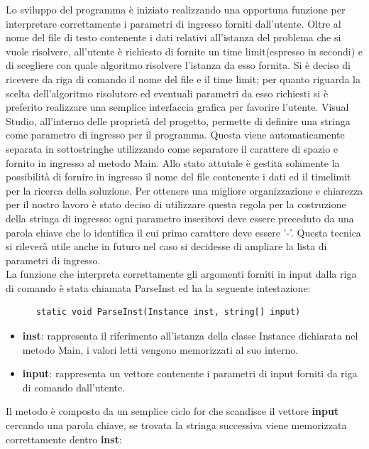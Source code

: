 \documentclass[11pt]{article}
\begin{document}
Lo sviluppo del programma \`e iniziato realizzando una opportuna funzione per interpretare correttamente i parametri di ingresso forniti dall'utente. Oltre al nome del file di testo contenente i dati relativi  all'istanza del problema che si vuole risolvere, all'utente \`e richiesto di fornite un time limit(espresso in secondi) e di scegliere con quale algoritmo risolvere l'istanza da esso fornita. Si \`e deciso di ricevere da riga di comando il nome del file e il time limit; per quanto riguarda la scelta dell'algoritmo risolutore ed eventuali parametri da esso richiesti si \`e preferito realizzare una semplice interfaccia grafica per favorire l'utente. 
Visual Studio, all'interno delle proprietà del progetto, permette di definire una stringa come parametro di ingresso per il programma. Questa viene automaticamente separata in sottostringhe utilizzando come separatore il carattere di spazio e fornito in ingresso al metodo Main. Allo stato attutale è gestita solamente la possibilità di fornire in ingresso il nome del file contenente i dati ed il timelimit per la ricerca della soluzione. Per ottenere una migliore organizzazione e chiarezza per il nostro lavoro è stato deciso di utilizzare questa regola per la costruzione della stringa di ingresso: ogni parametro inseritovi deve essere preceduto da una parola chiave che lo identifica il cui primo carattere deve essere '-'. Questa tecnica si rileverà utile anche in futuro nel caso si decidesse di ampliare la lista di parametri di ingresso.\\
La funzione che interpreta correttamente gli argomenti forniti in input dalla riga di comando \`e stata chiamata ParseInst ed ha la seguente intestazione:

\begin{lstlisting}
	  static void ParseInst(Instance inst, string[] input) 
\end{lstlisting}


\begin{itemize}
\item \textbf{inst}: rappresenta il riferimento all'istanza della classe Instance dichiarata nel metodo Main, i valori letti vengono memorizzati al suo interno.
\item \textbf{input}: rappresenta un vettore contenente i parametri di input forniti da riga di comando dall'utente.
\end{itemize}


Il metodo \`e composto da un semplice ciclo for che scandisce il vettore \textbf{input} cercando una parola chiave, se trovata la stringa successiva viene memorizzata correttamente dentro \textbf{inst}: 
\end{document}
